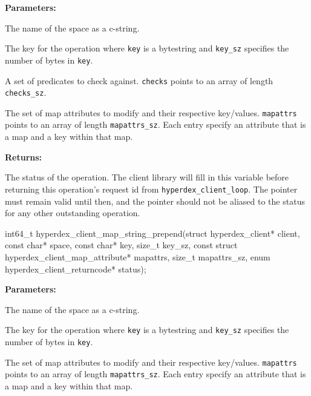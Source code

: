 \noindent\textbf{Parameters:}
\begin{description}[labelindent=\widthof{{\texttt{mapattrs}, \texttt{mapattrs\_sz}}},leftmargin=*,noitemsep,nolistsep,align=right]
\item[\texttt{space}] The name of the space as a c-string.
\item[\texttt{key}, \texttt{key\_sz}] The key for the operation where \texttt{key} is a bytestring and \texttt{key\_sz} specifies the number of bytes in \texttt{key}.
\item[\texttt{checks}, \texttt{checks\_sz}] A set of predicates to check against.  \texttt{checks} points to an array of length \texttt{checks\_sz}.
\item[\texttt{mapattrs}, \texttt{mapattrs\_sz}] The set of map attributes to modify and their respective key/values.  \texttt{mapattrs} points to an array of length \texttt{mapattrs\_sz}.  Each entry specify an attribute that is a map and a key within that map.
\end{description}

\noindent\textbf{Returns:}
\begin{description}[labelindent=\widthof{{\texttt{status}}},leftmargin=*,noitemsep,nolistsep,align=right]
\item[\texttt{status}] The status of the operation.  The client library will fill in this variable before returning this operation's request id from \texttt{hyperdex\_client\_loop}.  The pointer must remain valid until then, and the pointer should not be aliased to the status for any other outstanding operation.
\end{description}

\funcsep
\begin{ccode}
int64_t hyperdex_client_map_string_prepend(struct hyperdex_client* client,
                const char* space,
                const char* key, size_t key_sz,
                const struct hyperdex_client_map_attribute* mapattrs, size_t mapattrs_sz,
                enum hyperdex_client_returncode* status);
\end{ccode}
\funcdesc 

\noindent\textbf{Parameters:}
\begin{description}[labelindent=\widthof{{\texttt{mapattrs}, \texttt{mapattrs\_sz}}},leftmargin=*,noitemsep,nolistsep,align=right]
\item[\texttt{space}] The name of the space as a c-string.
\item[\texttt{key}, \texttt{key\_sz}] The key for the operation where \texttt{key} is a bytestring and \texttt{key\_sz} specifies the number of bytes in \texttt{key}.
\item[\texttt{mapattrs}, \texttt{mapattrs\_sz}] The set of map attributes to modify and their respective key/values.  \texttt{mapattrs} points to an array of length \texttt{mapattrs\_sz}.  Each entry specify an attribute that is a map and a key within that map.
\end{description}

